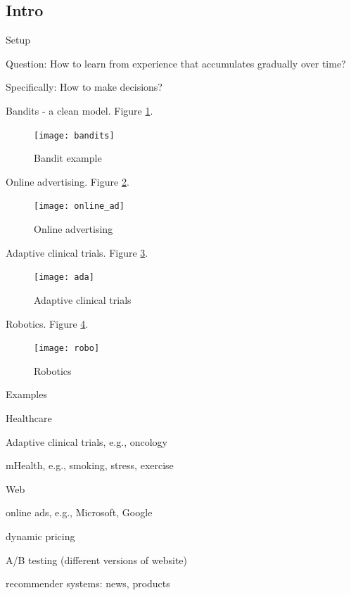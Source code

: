 \documentclass[english]{article}
\begin{document}
\subsection{Intro}

\benum

\item {Setup}
\bitem
\item Question: How to learn from experience that accumulates gradually over time?

\item Specifically: How to make decisions?

\eitem




\item {Bandits - a clean model}. Figure \ref{band_ex}.
\begin{figure}[h!]
\begin{center}
\texttt{[image: bandits]}
    \caption{Bandit example}
    \label{band_ex}
\end{center}
\end{figure}



\item {Online advertising}. Figure \ref{online_ad}.
\begin{figure}[h!]
\begin{center}
\texttt{[image: online\_ad]}
    \caption{Online advertising}
    \label{online_ad}
\end{center}
\end{figure}



\item {Adaptive clinical trials}. Figure \ref{ada_ct}.
\begin{figure}[h!]
\begin{center}
\texttt{[image: ada]}
    \caption{Adaptive clinical trials}
    \label{ada_ct}
\end{center}
\end{figure}



\item {Robotics}. Figure \ref{robo}.
\begin{figure}[h!]
\begin{center}
\texttt{[image: robo]}
    \caption{Robotics}
    \label{robo}
\end{center}
\end{figure}




\item {Examples}
\bitem
\item Healthcare
\bitem
\item Adaptive clinical trials, e.g., oncology
\item mHealth, e.g., smoking, stress, exercise
\eitem
\item Web
\bitem
\item online ads, e.g., Microsoft, Google
\item dynamic pricing
\item A/B testing (different versions of website)
\item recommender systems: news, products
\eitem
\end{document}
